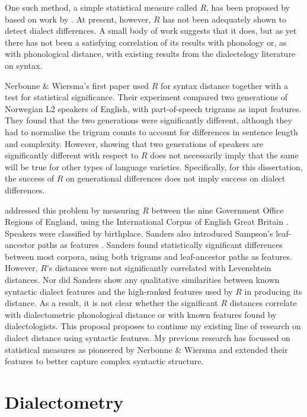 \documentclass[11pt]{article}
\begin{document}
One such method, a simple statistical measure called $R$,
has been proposed by  based on work by
. At present, however, $R$ has not been adequately
shown to detect dialect differences. A small body of work suggests
that it does, but as yet there has not been
a satisfying correlation of its results with phonology or, as with
phonological distance, with existing results from the dialectelogy
literature on syntax.

Nerbonne \& Wiersma's first paper used $R$ for syntax distance
together with a test for statistical significance\cite{nerbonne06}.
Their experiment compared two generations of
Norwegian L2 speakers of English, with part-of-speech trigrams as input features.
They found that the two generations were significantly
different, although they had to normalise the trigram counts to
account for differences in sentence length and complexity. However,
showing that two generations of speakers are significantly different with respect
to $R$ does not necessarily imply that the same will be true for other
types of language varieties. Specifically, for this dissertation, the
success of $R$ on generational differences does not imply success on
dialect differences.

 addressed this problem by measuring $R$ between
the nine Government Office Regions of England, using the International
Corpus of English Great Britain \cite{nelson02}. Speakers were classified by
birthplace. Sanders also introduced Sampson's leaf-ancestor paths as
features \cite{sampson00}. Sanders found statistically
significant differences between most corpora, using both trigrams and
leaf-ancestor paths as features. However, $R$'s distances were not
significantly correlated with Levenshtein distances. Nor did Sanders
show any qualitative similarities between known syntactic dialect
features and the high-ranked features used by $R$ in producing its
distance. As a result, it is not clear whether the significant $R$ distances
correlate with dialectometric phonological distance or with known
features found by dialectologists.
This proposal proposes to continue my existing line of research on
dialect distance using syntactic features. My previous research has
focussed on statistical measures as pioneered by Nerbonne \& Wiersma
and extended their features to better capture complex syntactic
structure.

\section{Dialectometry}
\end{document}
